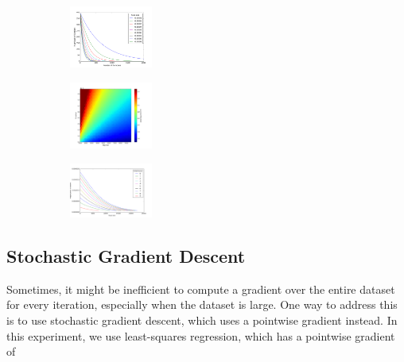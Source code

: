 \documentclass[10pt]{paper}
\begin{document}
\begin{figure}[ht!]
  \centering
  \begin{subfigure}
    \centering
      \includegraphics[width=0.3\textwidth]{../images/quadratic_steps_vs_mag}
  \end{subfigure}
  \begin{subfigure}
    \centering
      \includegraphics[width=0.3\textwidth]{../images/lsq_error_gradient}
  \end{subfigure}
  \begin{subfigure}
    \centering
      \includegraphics[width=0.3\textwidth]{../images/guess_vs_mags_2}
  \end{subfigure}
\end{figure}

\subsection{Stochastic Gradient Descent}

Sometimes, it might be inefficient to compute a gradient over the entire dataset for every iteration, especially when the dataset is large. One way to address this is to use stochastic gradient descent, which uses a pointwise gradient instead. In this experiment, we use least-squares regression, which has a pointwise gradient of 
\end{document}
